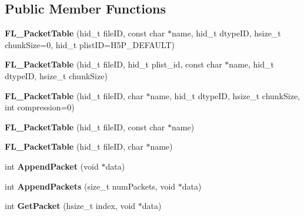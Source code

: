 \subsection*{Public Member Functions}
\begin{DoxyCompactItemize}
\item 
\mbox{\label{class_f_l___packet_table_a7d6e02d504f137abaa2e67b010ea9ba1}} 
{\bfseries F\+L\+\_\+\+Packet\+Table} (hid\+\_\+t file\+ID, const char $\ast$name, hid\+\_\+t dtype\+ID, hsize\+\_\+t chunk\+Size=0, hid\+\_\+t plist\+ID=H5\+P\+\_\+\+D\+E\+F\+A\+U\+LT)
\item 
\mbox{\label{class_f_l___packet_table_a0b0cde13ce7c6257b49eb1b38b03fd74}} 
{\bfseries F\+L\+\_\+\+Packet\+Table} (hid\+\_\+t file\+ID, hid\+\_\+t plist\+\_\+id, const char $\ast$name, hid\+\_\+t dtype\+ID, hsize\+\_\+t chunk\+Size)
\item 
\mbox{\label{class_f_l___packet_table_a9ce095ec7f8da87827559e6727bf933c}} 
{\bfseries F\+L\+\_\+\+Packet\+Table} (hid\+\_\+t file\+ID, char $\ast$name, hid\+\_\+t dtype\+ID, hsize\+\_\+t chunk\+Size, int compression=0)
\item 
\mbox{\label{class_f_l___packet_table_ae331cd0a76790556cd516eaa1076e6ff}} 
{\bfseries F\+L\+\_\+\+Packet\+Table} (hid\+\_\+t file\+ID, const char $\ast$name)
\item 
\mbox{\label{class_f_l___packet_table_a6af5d6b31eefde146fe25789e53a2c4c}} 
{\bfseries F\+L\+\_\+\+Packet\+Table} (hid\+\_\+t file\+ID, char $\ast$name)
\item 
\mbox{\label{class_f_l___packet_table_ad85d606ad528cefe7933defbfce89309}} 
int {\bfseries Append\+Packet} (void $\ast$data)
\item 
\mbox{\label{class_f_l___packet_table_a612444103e6a13a2ad68e9a25a7a2b87}} 
int {\bfseries Append\+Packets} (size\+\_\+t num\+Packets, void $\ast$data)
\item 
\mbox{\label{class_f_l___packet_table_aa5f3c5343b5f48130995102d559e049f}} 
int {\bfseries Get\+Packet} (hsize\+\_\+t index, void $\ast$data)

\end{DoxyCompactItemize}
